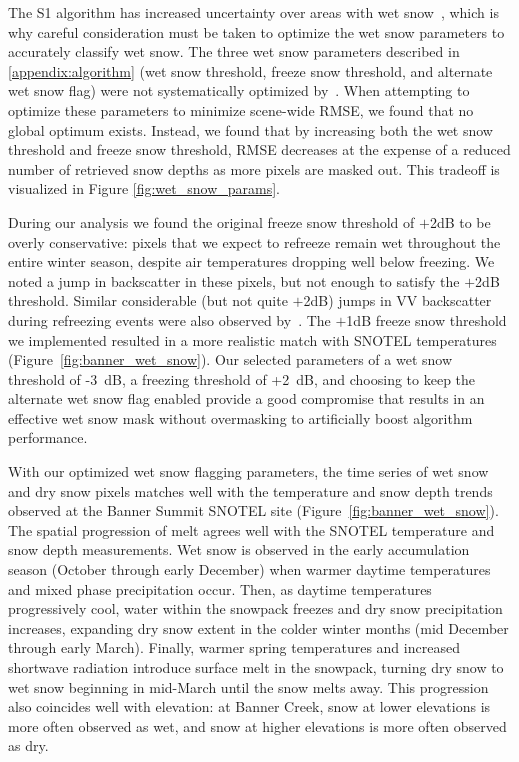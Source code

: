 \documentclass[journal abbreviation, manuscript]{copernicus}
\begin{document}
The S1 algorithm has increased uncertainty over areas with wet snow~\citep{Lievens.2022}, which is why careful consideration must be taken to optimize the wet snow parameters to accurately classify wet snow. The three wet snow parameters described in \ref{appendix:algorithm} (wet snow threshold, freeze snow threshold, and alternate wet snow flag) were not systematically optimized by~\citet{Lievens.2022}. When attempting to optimize these parameters to minimize scene-wide RMSE, we found that no global optimum exists. Instead, we found that by increasing both the wet snow threshold and freeze snow threshold, RMSE decreases at the expense of a reduced number of retrieved snow depths as more pixels are masked out. This tradeoff is visualized in Figure \ref{fig:wet_snow_params}.

During our analysis we found the original freeze snow threshold of $+$2dB to be overly conservative: pixels that we expect to refreeze remain wet throughout the entire winter season, despite air temperatures dropping well below freezing. We noted a jump in backscatter in these pixels, but not enough to satisfy the $+$2dB threshold. Similar considerable (but not quite $+$2dB) jumps in VV backscatter during refreezing events were also observed by~\citet{Lund.2022}. The $+$1dB freeze snow threshold we implemented resulted in a more realistic match with SNOTEL temperatures (Figure~\ref{fig:banner_wet_snow}). Our selected parameters of a wet snow threshold of -3~dB, a freezing threshold of +2~dB, and choosing to keep the alternate wet snow flag enabled provide a good compromise that results in an effective wet snow mask without overmasking to artificially boost algorithm performance.

With our optimized wet snow flagging parameters, the time series of wet snow and dry snow pixels matches well with the temperature and snow depth trends observed at the Banner Summit SNOTEL site (Figure~\ref{fig:banner_wet_snow}). The spatial progression of melt agrees well with the SNOTEL temperature and snow depth measurements. Wet snow is observed in the early accumulation season (October through early December) when warmer daytime temperatures and mixed phase precipitation occur. Then, as daytime temperatures progressively cool, water within the snowpack freezes and dry snow precipitation increases, expanding dry snow extent in the colder winter months (mid December through early March). Finally, warmer spring temperatures and increased shortwave radiation introduce surface melt in the snowpack, turning dry snow to wet snow beginning in mid-March until the snow melts away. This progression also coincides well with elevation: at Banner Creek, snow at lower elevations is more often observed as wet, and snow at higher elevations is more often observed as dry. 
\end{document}
